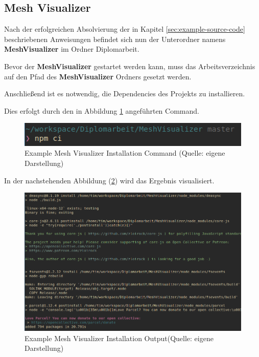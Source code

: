 \subsection{Mesh Visualizer}\label{sec:example-mesh-visualizer}

Nach der erfolgreichen Absolvierung der in Kapitel \ref{sec:example-source-code} beschriebenen Anweisungen befindet sich nun der Unterordner namens \textbf{MeshVisualizer} im Ordner Diplomarbeit.

Bevor der \textbf{MeshVisualizer} gestartet werden kann, muss das Arbeitsverzeichnis auf den Pfad des \textbf{MeshVisualizer} Ordners gesetzt werden.

Anschließend ist es notwendig, die Dependencies des Projekts zu installieren.

Dies erfolgt durch den in Abbildung \ref{abb:example_mesh_visualizer_installation_cmd} angeführten Command.

\begin{figure}[H]
    \begin{center}
        \includegraphics[scale=1]{images/example_mesh_visualizer_installation_cmd.png}
        \caption{Example Mesh Visualizer Installation Command (Quelle: eigene Darstellung)}
        \label{abb:example_mesh_visualizer_installation_cmd}
    \end{center}
\end{figure}

\pagebreak
In der nachstehenden Abbildung (\ref{abb:example_mesh_visualizer_installation_output}) wird das Ergebnis visualisiert.

\begin{figure}[H]
    \begin{center}
        \includegraphics[scale=.6]{images/example_mesh_visualizer_installation_output.png}
        \caption{Example Mesh Visualizer Installation Output(Quelle: eigene Darstellung)}
        \label{abb:example_mesh_visualizer_installation_output}
    \end{center}
\end{figure}

